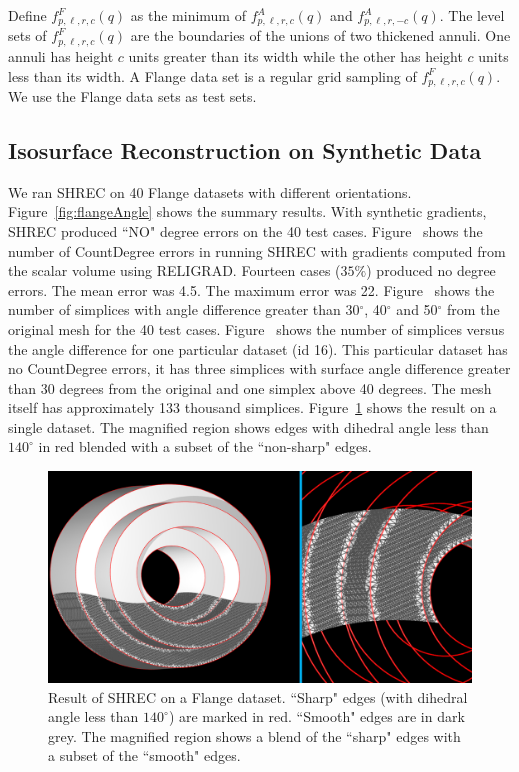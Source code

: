 Define $f^F_{p,\ell,r,c}(q)$ as the minimum
of $f^A_{p,\ell,r,c}(q)$ and $f^A_{p,\ell,r,-c}(q)$.
The level sets of $f^F_{p,\ell,r,c}(q)$ are the boundaries
of the unions of two thickened annuli.
One annuli has height $c$ units greater than its width
while the other has height $c$ units less than its width.
A Flange data set is a regular grid sampling of $f^F_{p,\ell,r,c}(q)$. 
We use the Flange data sets as test sets.

\subsection{Isosurface Reconstruction on Synthetic Data}
We ran SHREC on 40 Flange datasets with different orientations. Figure~\ref{fig:flangeAngle} shows the summary results.
With synthetic gradients, SHREC produced ``NO" degree errors on the 40 test cases.
Figure~\protect{} shows the number of CountDegree errors in running SHREC with gradients computed from the scalar volume using RELIGRAD.
Fourteen cases ($35\%$) produced no degree errors. The mean error was 4.5. The maximum error was 22.
Figure~\protect{} shows the number of simplices with angle difference greater than 30$^\circ$, 40$^\circ$ and 50$^\circ$ from the original mesh for the 40 test cases. Figure~\protect{} shows  the number of simplices versus the angle difference for one particular dataset (id 16). This particular dataset has no CountDegree errors, it has three simplices with surface angle difference greater than 30 degrees from the original and one simplex above 40 degrees. The mesh itself has approximately 133 thousand simplices. 
Figure~\ref{fig:flange1} shows the result on a single dataset. The magnified region shows edges with dihedral angle less than $140^\circ$ in red blended with a subset of the ``non-sharp" edges. 
\begin{figure}[tb]
\includegraphics[width=\linewidth]{images/shrecFlangeCombine2.eps}
\caption{Result of SHREC on a Flange dataset. ``Sharp" edges (with dihedral angle less than $140^\circ$) are marked in red. 
``Smooth" edges are in dark grey. The magnified region shows a blend of the ``sharp" edges with a subset of the ``smooth" edges.}
\label{fig:flange1}
\end{figure}
